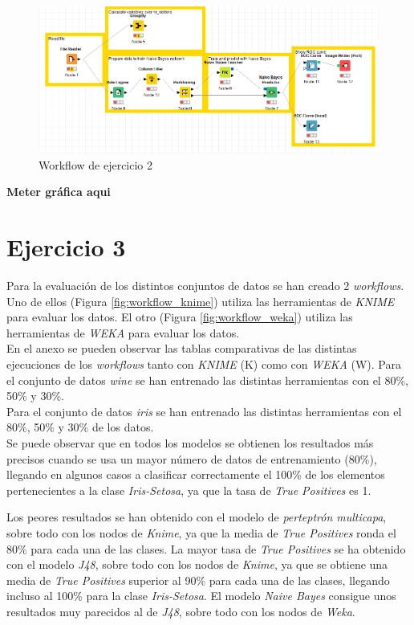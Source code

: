 \documentclass[10pt,a4paper]{article}
\begin{document}
\begin{figure}[h!]
	\centering
	\includegraphics[scale=0.5]{images/workflow_ej2.png}
	\caption{Workflow de ejercicio 2}
	\label{fig:workflow_ej2}
\end{figure}

{\Huge \textbf{Meter gráfica aqui}}


\section{Ejercicio 3}

Para la evaluación de los distintos conjuntos de datos se han creado 2 \emph{workflows}. Uno de ellos (Figura \ref{fig:workflow_knime}) utiliza las herramientas de \emph{KNIME} para evaluar los datos. El otro (Figura \ref{fig:workflow_weka}) utiliza las herramientas de \emph{WEKA} para evaluar los datos.\\
En el anexo se pueden observar las tablas comparativas de las distintas ejecuciones de los \emph{workflows} tanto con \emph{KNIME} (K) como con \emph{WEKA} (W).
Para el conjunto de datos \emph{wine} se han entrenado las distintas herramientas con el 80\%, 50\% y 30\%.\\
Para el conjunto de datos \emph{iris} se han entrenado las distintas herramientas con el 80\%, 50\% y 30\% de los datos.\\ Se puede observar que en todos los modelos se obtienen los resultados más precisos cuando se usa un mayor número de datos de entrenamiento (80\%), llegando en algunos casos a clasificar correctamente el 100\% de los elementos pertenecientes a la clase \textit{Iris-Setosa}, ya que la tasa de \textit{True Positives} es 1.\par
Los peores resultados se han obtenido con el modelo de \textit{perteptrón multicapa}, sobre todo con los nodos de \textit{Knime}, ya que la media de \textit{True Positives} ronda el 80\% para cada una de las clases.
La mayor tasa de \textit{True Positives} se ha obtenido con el modelo \textit{J48}, sobre todo con los nodos de \textit{Knime}, ya que se obtiene una media de \textit{True Positives} superior al 90\% para cada una de las clases, llegando incluso al 100\% para la clase \textit{Iris-Setosa}. El modelo \textit{Naive Bayes} consigue unos resultados muy parecidos al de \textit{J48}, sobre todo con los nodos de \textit{Weka}.
\end{document}
